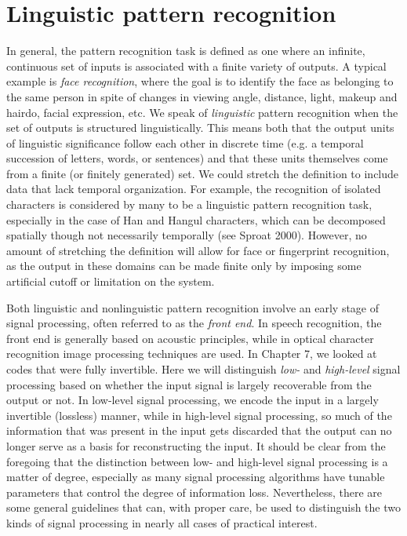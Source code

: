 \chapter{Linguistic pattern recognition}

\noindent
In general, the pattern recognition task is defined as one where an infinite,
continuous set of inputs is associated with a finite variety of outputs. A
typical example is {\it face recognition},  where the
goal is to identify the face as belonging to the same person in spite of
changes in viewing angle, distance, light, makeup and hairdo, facial
expression, etc. We speak of {\it linguistic} pattern recognition when the set
of outputs is structured linguistically. This means both that the output
units of linguistic significance follow each other in discrete time (e.g. a
temporal succession of letters, words, or sentences) and that these units
themselves come from a finite (or finitely generated) set. We could stretch
the definition to include data that lack temporal organization. For example,
the recognition of isolated characters is considered by many to be a
linguistic pattern recognition task, especially in the case of Han and Hangul
characters, which can be decomposed spatially though not necessarily
temporally (see Sproat 2000).\nocite{Sproat:2000} However, no amount of
stretching the definition will allow for face or fingerprint recognition, as
the output in these domains can be made finite only by imposing some
artificial cutoff or limitation on the system.
 

Both linguistic and nonlinguistic pattern recognition involve an early stage
of signal processing, often referred to as the {\it front end}. In speech
recognition, the front end is generally based on acoustic principles, while in
optical character recognition image processing techniques are used. In Chapter
7, we looked at codes that were fully invertible. Here we will distinguish
{\it low-} and {\it high-level} signal processing based on whether the input
signal is largely recoverable from the output or not. In low-level signal
processing, we encode the input in a largely invertible (lossless) manner,
while in high-level signal processing, so much of the information that was
present in the input gets discarded that the output can no longer serve as a
basis for reconstructing the input. It should be clear from the foregoing that
the distinction between low- and high-level signal processing is a matter of
degree, especially as many signal processing algorithms have tunable
parameters that control the degree of information loss. Nevertheless, there
are some general guidelines that can, with proper care, be used to distinguish
the two kinds of signal processing in nearly all cases of practical interest.

